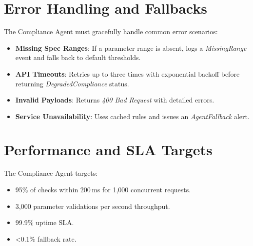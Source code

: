 \documentclass[12pt]{report}
\begin{document}
\section{Error Handling and Fallbacks}
The Compliance Agent must gracefully handle common error scenarios:
\begin{itemize}
  \item \textbf{Missing Spec Ranges}: If a parameter range is absent, logs a \emph{MissingRange} event and falls back to default thresholds.
  \item \textbf{API Timeouts}: Retries up to three times with exponential backoff before returning \emph{DegradedCompliance} status.
  \item \textbf{Invalid Payloads}: Returns \emph{400 Bad Request} with detailed errors.
  \item \textbf{Service Unavailability}: Uses cached rules and issues an \emph{AgentFallback} alert.
\end{itemize}

\section{Performance and SLA Targets}
The Compliance Agent targets:
\begin{itemize}
  \item 95\% of checks within 200\,ms for 1,000 concurrent requests.
  \item 3,000 parameter validations per second throughput.
  \item 99.9\% uptime SLA.
  \item <0.1\% fallback rate.
\end{itemize}
\end{document}

